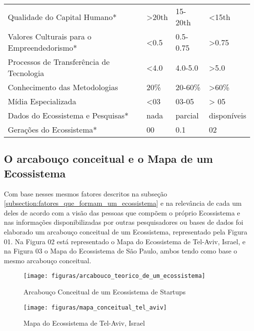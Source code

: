 \begin{table}[!htb]
\begin{tabular}{llll}
Qualidade do Capital Humano*                               &    >20th   &   15-20th  &    <15th \\
Valores Culturais para o Empreendedorismo*                 &    <0.5    &   0.5-0.75 &    >0.75 \\
Processos de Transferência de Tecnologia                   &    <4.0    &   4.0-5.0  &    >5.0  \\
Conhecimento das Metodologias                              &    20\%    &   20-60\%  &    >60\% \\
Mídia Especializada                                        &    <03     &   03-05    &    > 05  \\
Dados do Ecossistema e Pesquisas*                          &    nada    & parcial &disponíveis  \\
Gerações do Ecossistema*                                   &     00     &    0.1     &    02    \\
\end{tabular}
\end{table}

\subsection{O arcabouço conceitual e o Mapa de um Ecossistema}
\label{subsection:arcabouco_conceitual_e_modelo}

Com base nesses mesmos fatores descritos na subseção \ref{subsection:fatores_que_formam_um_ecossistema} e na relevância de cada um deles de acordo com a visão das pessoas que compõem o próprio Ecossistema e nas informações disponibilizadas por outras pesquisadores ou bases de dados foi elaborado um arcabouço conceitual de um Ecossistema, representado pela Figura 01. Na Figura 02 está representado o Mapa do Ecossistema de Tel-Aviv, Israel, e na Figura 03 o Mapa do Ecossistema de São Paulo, ambos tendo como base o mesmo arcabouço conceitual.

\begin{figure}[!htb]
\centering
\texttt{[image: figuras/arcabouco\_teorico\_de\_um\_ecossistema]}
\caption{Arcabouço Conceitual de um Ecossistema de Startups}
\label{Rotulo}
\end{figure}

\begin{figure}[!htbp]
\centering
\texttt{[image: figuras/mapa\_conceitual\_tel\_aviv]}
\caption{Mapa do Ecossistema de Tel-Aviv, Israel}
\label{Rotulo}
\end{figure}

